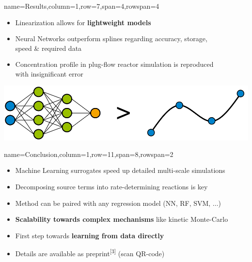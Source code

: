 \documentclass[
	accentcolor=3c,
	boxstyle=colored %
	]{tudasciposter}
\begin{document}
\begin{tcbposter}[
	poster={
		columns=8,
		rows=12,
		spacing=1cm,
	},]
\begin{posterboxenv}[title=3. Results]{name=Results,column=1,row=7,span=4,rowspan=4}
\begin{itemize}
		\item Linearization allows for \textbf{lightweight models}
		\item Neural Networks outperform splines regarding accuracy, storage, \\ speed \& required data
		\item Concentration profile in plug-flow reactor simulation is reproduced \\with insignificant error	
	\end{itemize}
	\centering
	\includegraphics[width=.75\linewidth]{abb/nngtspline}
\end{posterboxenv}

\begin{posterboxenv}[title=4. Conclusion]{name=Conclusion,column=1,row=11,span=8,rowspan=2}
\begin{multicols}{2}		
	\begin{itemize}
		\item Machine Learning surrogates speed up detailed multi-scale simulations
		\item Decomposing source terms into rate-determining reactions is key%
		\item Method can be paired with any regression model (NN, RF, SVM, $\dots$)
		\item \textbf{Scalability towards complex mechanisms} like kinetic Monte-Carlo
		\item First step towards \textbf{learning from data directly}
		\item Details are available as preprint\textsuperscript{[3]} (scan QR-code)
	\end{itemize}
\end{multicols}

\end{posterboxenv}

\end{tcbposter}
\end{document}
